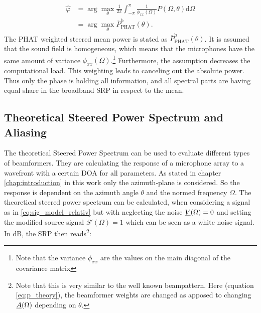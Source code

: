 \begin{equation}
\begin{split}
\hat{\varphi} &= \arg \max_{\theta}\frac{1}{2\pi}\int^\pi_{-\pi}\frac{1}{\phi_{xx}(\Omega)}P(\Omega,\theta)\mathrm{d}\Omega\\
 &= \arg \max_{\theta} \overline{P}^\text{b}_\text{PHAT}(\theta).
\end{split}
\label{eq:doa_est_broadband_phat}
\end{equation}
The \ac{PHAT} weighted steered mean power is stated as $ \overline{P}^\text{b}_\text{PHAT}(\theta)$. It is assumed that the sound field is homogeneous, which means that the microphones have the same amount of variance $\phi_{xx}(\Omega)$.\footnote{Note that the variance $\phi_{xx}$ are the values on the main diagonal of the covariance matrix} Furthermore, the assumption decreases the computational load.
This weighting leads to canceling out the absolute power. Thus only the phase is holding all information, and all spectral parts are having equal share in the broadband \ac{SRP} in respect to the mean. \cite[Chapter~8]{brandstein2013microphone}\cite{madhu2008scalable}\\


\subsection{Theoretical Steered Power Spectrum and Aliasing}


The theoretical Steered Power Spectrum can be used to evaluate different types of beamformers. They are calculating the response of a microphone array to a wavefront with a certain \ac{DOA} for all parameters. As stated in chapter \ref{chap:introduction} in this work only the azimuth-plane is considered. So the response is dependent on the azimuth angle $\theta$ and the normed frequency $\Omega$. The theoretical steered power spectrum can be calculated, when considering a signal as in \ref{eq:sig_model_relativ} but with neglecting the noise $\underline{V}(\Omega) = 0$ and setting the modified source signal $S'(\Omega) = 1$ which can be seen as a white noise signal. %
In dB, the \ac{SRP} then reads\footnote{Note that this is very similar to the well known beampattern. Here (equation \ref{eq:p_theory}), the beamformer weights are changed as apposed to changing $\underline{A}(\Omega)$ depending on $\theta$.}:

